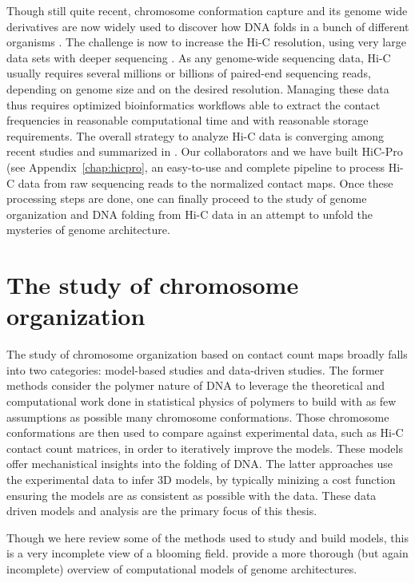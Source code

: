 Though still quite recent, chromosome conformation capture and its genome
wide derivatives are now widely used to discover how DNA folds in a bunch of
different organisms \citep{duan:three, sexton:three-dimensional,
tanizawa:mapping, ay:three-dimensional}. The challenge is now to increase the
Hi-C resolution, using very large data sets with deeper sequencing
\citep{rao:3d, jin:high-resolution}. As any genome-wide sequencing data, Hi-C
usually requires several millions or billions of paired-end sequencing reads,
depending on genome size and on the desired resolution. Managing these data
thus requires optimized bioinformatics workflows able to extract the contact
frequencies in reasonable computational time and with reasonable storage
requirements. The overall strategy to analyze Hi-C data is converging among
recent studies and summarized in \cite{lajoie:hitchhiker}. Our collaborators
and we have built HiC-Pro (see Appendix~\ref{chap:hicpro},
an easy-to-use and complete pipeline to process
Hi-C data from raw sequencing reads to the normalized contact maps. Once these
processing steps are done, one can finally proceed to the study of genome
organization and DNA folding from Hi-C data in an attempt to unfold the
mysteries of genome architecture.

\section{The study of chromosome organization}

The study of chromosome organization based on contact count maps broadly
falls into two categories: model-based studies and data-driven studies. The
former methods consider the polymer nature of DNA to leverage the theoretical
and computational work done in statistical physics of polymers to build with
as few assumptions as possible many chromosome conformations. Those chromosome
conformations are then used to compare against experimental data, such as Hi-C
contact count matrices, in order to iteratively improve the models. These
models offer mechanistical insights into the folding of DNA. The latter
approaches use the experimental data to infer 3D models, by typically minizing
a cost function ensuring the models are as consistent as possible with the
data. These data driven models and analysis are the primary focus of this
thesis.

Though we here review some of the methods used to study and build models, this
is a very incomplete view of a blooming field. \citet{rosa:computational}
provide a more thorough (but again incomplete) overview of computational models
of genome architectures.

